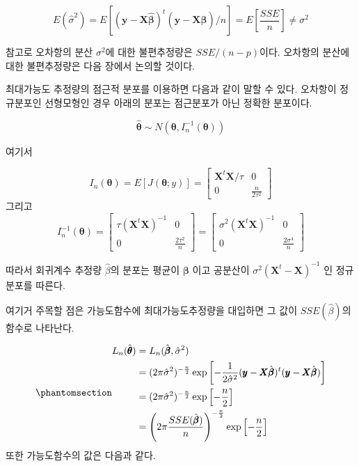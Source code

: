 \documentclass[
  11pt,
  a4paper,
  oneside]{scrbook}
\theoremstyle{definition}
\theoremstyle{plain}
\theoremstyle{definition}
\theoremstyle{definition}
\theoremstyle{remark}
\begin{document}
\[ E(\hat \sigma^2)  = E \left [ ( \pmb y- \pmb X  {\hat {\pmb \beta}})^t ( \pmb y-\pmb  X  {\hat {\pmb \beta}})/n \right ] = E \left [ \frac{SSE}{n} \right ]  \ne \sigma^2 \]

참고로 오차항의 분산 \(\sigma^2\)에 대한 불편추정량은 \(SSE/(n-p)\)이다.
오차항의 분산에 대한 불편추정량은 다음 장에서 논의할 것이다.

최대가능도 추정량의 점근적 분포를 이용하면 다음과 같이 말할 수 있다.
오차항이 정규분포인 선형모형인 경우 아래의 분포는 점근분포가 아닌 정확한
분포이다.

\[ \hat { \pmb \theta}  \sim  N( \pmb \theta ,  I_n^{-1}( \pmb \theta)) \]

여기서

\[  I_n( \pmb \theta) = E[ J( \pmb \theta;  y)] =  
\begin{bmatrix}
      {\pmb X}^t \pmb X /\tau & 0   \\
    0  &   \frac{n}{2\tau^2} 
  \end{bmatrix}
\] 그리고 \[  I_n^{-1}( \pmb \theta) = 
\begin{bmatrix}
     \tau( {\pmb X}^t  \pmb X)^{-1}  & 0   \\
    0  &   \frac{2\tau^2}{n} 
  \end{bmatrix}
  = 
\begin{bmatrix}
     \sigma^2( {\pmb X}^t  \pmb X)^{-1}  & 0   \\
    0  &   \frac{2\sigma^4}{n} 
  \end{bmatrix}
\]

따라서 회귀계수 추정량 \(\hat { \beta}\)의 분포는 평균이 \(\pmb \beta\)
이고 공분산이 \(\sigma^2( {\pmb X}^t - \pmb X)^{-1}\) 인 정규분포를
따른다.

여기거 주목할 점은 가능도함수에 최대가능도추정량을 대입하면 그 값이
\(SSE(\hat { \beta})\)의 함수로 나타난다.

\begin{equation}\phantomsection\label{eq-likefull}{
\begin{align}
 L_n(\hat { \pmb \theta} ) & = L_n(\hat { \pmb \beta} ,\hat \sigma^2 ) \notag \\
 &=  (2\pi\hat \sigma^2)^{-\frac{n}{2}} \exp \left [-\frac{1}{2 \hat \sigma^2}( \pmb y- \pmb X \hat { \pmb \beta})^t( \pmb y- \pmb X \hat { \pmb \beta} ) \right ] \notag  \\
& = (2\pi\hat \sigma^2)^{-\frac{n}{2}} \exp \left [-\frac{n}{2} \right ]  \notag  \\
& = \left (2\pi \frac{SSE(\hat { \pmb \beta})}{n} \right )^{-\frac{n}{2}} \exp \left [-\frac{n}{2} \right ] 
\end{align} 
}\end{equation} 또한 가능도함수의 값은 다음과 같다.
\end{document}
